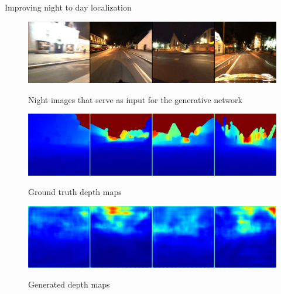 \begin{frame}{Improving night to day localization}
	\begin{figure}
		\centering
		\begin{minipage}{0.6\linewidth}
			\includegraphics[width=0.9\linewidth]{im/res/night_input}
		\end{minipage}
		\begin{minipage}{0.35\linewidth}
			Night images that serve as input for the generative network
		\end{minipage}
	\end{figure}
	\vspace{-0.5cm}
	\begin{figure}
		\centering
		\begin{minipage}{0.6\linewidth}
			\includegraphics[width=0.9\linewidth]{im/res/night_gt}
		\end{minipage}
		\begin{minipage}{0.35\linewidth}
			\raggedright		
			Ground truth depth maps
		\end{minipage}
	\end{figure}	
	\vspace{-0.5cm}
	\begin{figure}
		\centering
		\begin{minipage}{0.6\linewidth}
			\includegraphics[width=0.9\linewidth]{im/res/night_noft}
		\end{minipage}
		\begin{minipage}{0.35\linewidth}
			\raggedright		
			Generated depth maps
		\end{minipage}
	\end{figure}


\end{frame}
